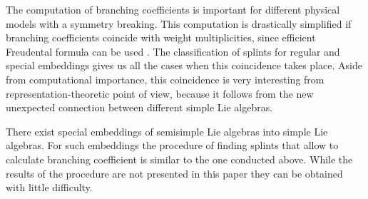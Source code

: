 \documentclass[12pt]{article}
\begin{document}
The computation of branching coefficients is important for different physical models with a symmetry
breaking. This computation is drastically simplified if branching coefficients coincide with weight
multiplicities, since efficient Freudental formula can be used \cite{moody1982fast}. The classification
of splints for regular and special embeddings gives us all the cases when this coincidence takes
place. Aside from computational importance, this coincidence is very interesting from
representation-theoretic point of view, because it follows from the new unexpected connection between
different simple Lie algebras. 

There exist special embeddings of semisimple Lie algebras into simple Lie algebras. For such
embeddings the procedure of finding splints that allow to calculate branching coefficient is similar
to the one conducted above. While the results of the procedure are not presented in this paper they
can be obtained with little difficulty.


{} 

\end{document}
